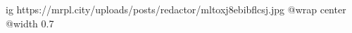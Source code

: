  
 
 
 
 

\ifcmt
  ig https://mrpl.city/uploads/posts/redactor/mltoxj8ebibflcsj.jpg
  @wrap center
  @width 0.7
\fi

